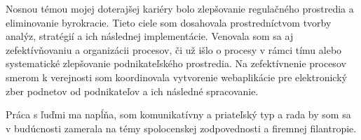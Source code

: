 

\begin{cvparagraph}

Nosnou témou mojej doterajšej kariéry bolo zlepšovanie regulačného prostredia a eliminovanie byrokracie. Tieto ciele som dosahovala prostredníctvom tvorby analýz, stratégií a ich následnej implementácie. Venovala som sa aj zefektívňovaniu a organizácii procesov, či už išlo o procesy v rámci tímu alebo systematické zlepšovanie podnikateľského prostredia. Na zefektívnenie procesov smerom k verejnosti som koordinovala vytvorenie webaplikácie pre elektronický zber podnetov od podnikateľov a ich následné spracovanie.

Práca s ľuďmi ma napĺňa, som komunikatívny a priateľský typ a rada by som sa v budúcnosti zamerala na témy spolocenskej zodpovednosti a firemnej filantropie.
\end{cvparagraph}
